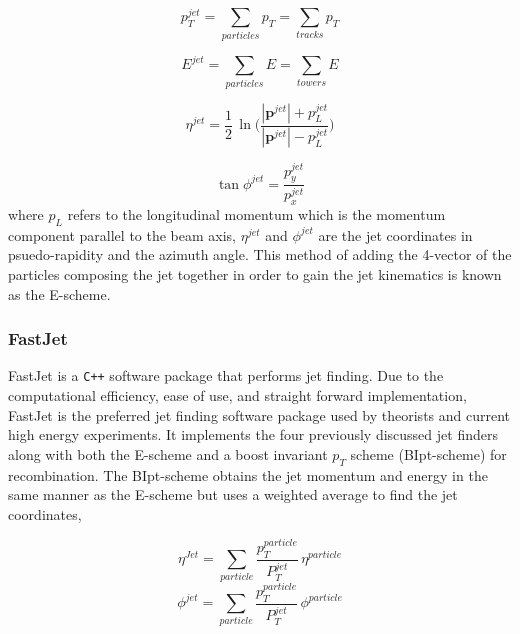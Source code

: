 \begin{equation}
p_{T}^{jet} = \sum_{particles} p_{T} = \sum_{tracks} p_{T}
\label{eq:JePt}
\end{equation}

\begin{equation}
E^{jet} = \sum_{particles} E = \sum_{towers} E
\label{eq:JetE}
\end{equation}

\begin{equation}
\eta^{jet} = \frac{1}{2} \, \ln \Bigg (  \frac{|\boldsymbol{p}^{jet}| + p_{L}^{jet}}{|\boldsymbol{p}^{jet}| - p_{L}^{jet}}  \Bigg )
\label{eq:JetEta}
\end{equation}

\begin{equation}
\tan \phi^{jet} = \frac{p_{y}^{jet}}{p_{x}^{jet}}
\label{eq:JetPhi}
\end{equation}
\noindent 
where $p_{L}$ refers to the longitudinal momentum which is the momentum component parallel to the beam axis, $\eta^{jet}$ and $\phi^{jet}$ are the jet coordinates in psuedo-rapidity and the azimuth angle.  This method of adding the 4-vector of the particles composing the jet together in order to gain the jet kinematics is known as the E-scheme\cite{Cacciari:2011ma}.

\subsubsection{FastJet}
FastJet\cite{Cacciari:2011ma} is a \verb|C++| software package that performs jet finding.  Due to the computational efficiency, ease of use, and straight forward implementation, FastJet is the preferred jet finding software package used by theorists and current high energy experiments. It implements the four previously discussed jet finders along with both the E-scheme and a boost invariant $p_{T}$ scheme (BIpt-scheme) for recombination.  The BIpt-scheme obtains the jet momentum and energy in the same manner as the E-scheme but uses a weighted average to find the jet coordinates,

\begin{equation}
\eta^{Jet} = \sum_{particle} \frac{p_{T}^{particle}}{P_{T}^{jet}} \, \eta^{particle}
\label{eq:JetEtaRecom}
\end{equation}
\begin{equation}
\phi^{jet} = \sum_{particle} \frac{p_{T}^{particle}}{P_{T}^{jet}} \, \phi^{particle}
\label{eq:JetPhiRecom}
\end{equation}

